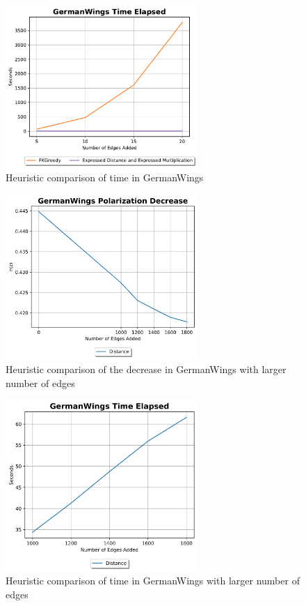 \begin{figure}[H]
	\centering
	\includegraphics[width=0.65\textwidth]{Figures/GermanWings Time Elapsed}
	\caption{Heuristic comparison of time in GermanWings}
	\label{fig:germanwings_time}
\end{figure}
\clearpage

\begin{figure}[H]
	\centering
	\includegraphics[width=0.65\textwidth]{Figures/GermanWings Polarization Decrease 2}
	\caption{Heuristic comparison of the decrease in GermanWings with larger number of edges}
	\label{fig:germanwings_pol}
\end{figure}


\begin{figure}[H]
	\centering
	\includegraphics[width=0.65\textwidth]{Figures/GermanWings Time Elapsed 2}
	\caption{Heuristic comparison of time in GermanWings with larger number of edges}
	\label{fig:germanwings_time}
\end{figure}
\clearpage


